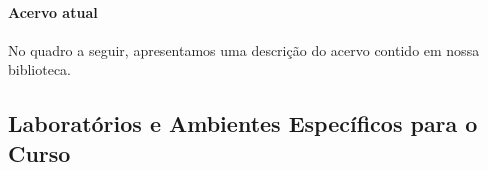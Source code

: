
\paragraph{Acervo atual}

No quadro a seguir, apresentamos uma descrição do acervo contido em nossa biblioteca.

\subsection{Laborat\'orios e Ambientes Espec\'ificos para o Curso}



